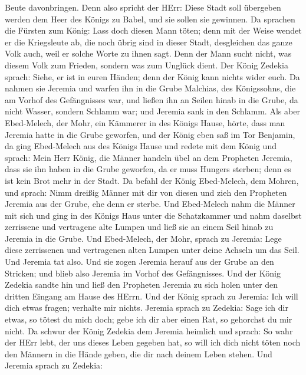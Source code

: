Beute davonbringen.  Denn also spricht der HErr: Diese Stadt
soll übergeben werden dem Heer des Königs zu Babel, und sie sollen sie
gewinnen.  Da sprachen die Fürsten zum König: Lass doch
diesen Mann töten; denn mit der Weise wendet er die Kriegsleute ab, die
noch übrig sind in dieser Stadt, desgleichen das ganze Volk auch, weil
er solche Worte zu ihnen sagt. Denn der Mann sucht nicht, was diesem
Volk zum Frieden, sondern was zum Unglück dient.  Der König
Zedekia sprach: Siehe, er ist in euren Händen; denn der König kann
nichts wider euch.  Da nahmen sie Jeremia und warfen ihn in
die Grube Malchias, des Königssohns, die am Vorhof des Gefängnisses war,
und ließen ihn an Seilen hinab in die Grube, da nicht Wasser, sondern
Schlamm war; und Jeremia sank in den Schlamm.  Als aber
Ebed-Melech, der Mohr, ein Kämmerer in des Königs Hause, hörte, dass man
Jeremia hatte in die Grube geworfen, und der König eben saß im Tor
Benjamin,  da ging Ebed-Melech aus des Königs Hause und
redete mit dem König und sprach:  Mein Herr König, die
Männer handeln übel an dem Propheten Jeremia, dass sie ihn haben in die
Grube geworfen, da er muss Hungers sterben; denn es ist kein Brot mehr
in der Stadt.  Da befahl der König Ebed-Melech, dem Mohren,
und sprach: Nimm dreißig Männer mit dir von diesen und zieh den
Propheten Jeremia aus der Grube, ehe denn er sterbe.  Und
Ebed-Melech nahm die Männer mit sich und ging in des Königs Haus unter
die Schatzkammer und nahm daselbst zerrissene und vertragene alte Lumpen
und ließ sie an einem Seil hinab zu Jeremia in die Grube. 
Und Ebed-Melech, der Mohr, sprach zu Jeremia: Lege diese zerrissenen und
vertragenen alten Lumpen unter deine Achseln um das Seil. Und Jeremia
tat also.  Und sie zogen Jeremia herauf aus der Grube an
den Stricken; und blieb also Jeremia im Vorhof des Gefängnisses.
 Und der König Zedekia sandte hin und ließ den Propheten
Jeremia zu sich holen unter den dritten Eingang am Hause des HErrn. Und
der König sprach zu Jeremia: Ich will dich etwas fragen; verhalte mir
nichts.  Jeremia sprach zu Zedekia: Sage ich dir etwas, so
tötest du mich doch; gebe ich dir aber einen Rat, so gehorchst du mir
nicht.  Da schwur der König Zedekia dem Jeremia heimlich
und sprach: So wahr der HErr lebt, der uns dieses Leben gegeben hat, so
will ich dich nicht töten noch den Männern in die Hände geben, die dir
nach deinem Leben stehen.  Und Jeremia sprach zu Zedekia:
